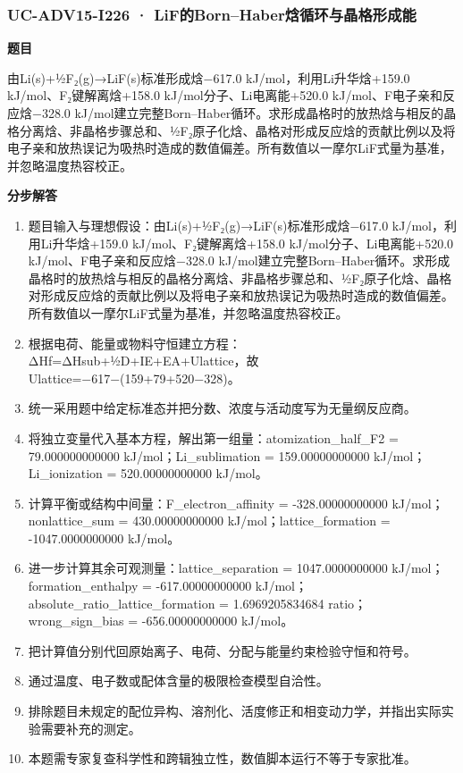 \documentclass[UTF8,11pt,a4paper]{ctexart}
\begin{document}
\subsubsection*{UC-ADV15-I226 · LiF的Born–Haber焓循环与晶格形成能}
\noindent\textbf{题目}\par
由Li(s)+½F₂(g)→LiF(s)标准形成焓−617.0 kJ/mol，利用Li升华焓+159.0 kJ/mol、F₂键解离焓+158.0 kJ/mol分子、Li电离能+520.0 kJ/mol、F电子亲和反应焓−328.0 kJ/mol建立完整Born–Haber循环。求形成晶格时的放热焓与相反的晶格分离焓、非晶格步骤总和、½F₂原子化焓、晶格对形成反应焓的贡献比例以及将电子亲和放热误记为吸热时造成的数值偏差。所有数值以一摩尔LiF式量为基准，并忽略温度热容校正。\par
\medskip\noindent\textbf{分步解答}
\begin{enumerate}
\item 题目输入与理想假设：由Li(s)+½F₂(g)→LiF(s)标准形成焓−617.0 kJ/mol，利用Li升华焓+159.0 kJ/mol、F₂键解离焓+158.0 kJ/mol分子、Li电离能+520.0 kJ/mol、F电子亲和反应焓−328.0 kJ/mol建立完整Born–Haber循环。求形成晶格时的放热焓与相反的晶格分离焓、非晶格步骤总和、½F₂原子化焓、晶格对形成反应焓的贡献比例以及将电子亲和放热误记为吸热时造成的数值偏差。所有数值以一摩尔LiF式量为基准，并忽略温度热容校正。
\item 根据电荷、能量或物料守恒建立方程：ΔHf=ΔHsub+½D+IE+EA+Ulattice，故Ulattice=−617−(159+79+520−328)。
\item 统一采用题中给定标准态并把分数、浓度与活动度写为无量纲反应商。
\item 将独立变量代入基本方程，解出第一组量：atomization\_half\_F2 = 79.000000000000 kJ/mol；Li\_sublimation = 159.00000000000 kJ/mol；Li\_ionization = 520.00000000000 kJ/mol。
\item 计算平衡或结构中间量：F\_electron\_affinity = -328.00000000000 kJ/mol；nonlattice\_sum = 430.00000000000 kJ/mol；lattice\_formation = -1047.0000000000 kJ/mol。
\item 进一步计算其余可观测量：lattice\_separation = 1047.0000000000 kJ/mol；formation\_enthalpy = -617.00000000000 kJ/mol；absolute\_ratio\_lattice\_formation = 1.6969205834684 ratio；wrong\_sign\_bias = -656.00000000000 kJ/mol。
\item 把计算值分别代回原始离子、电荷、分配与能量约束检验守恒和符号。
\item 通过温度、电子数或配体含量的极限检查模型自洽性。
\item 排除题目未规定的配位异构、溶剂化、活度修正和相变动力学，并指出实际实验需要补充的测定。
\item 本题需专家复查科学性和跨辑独立性，数值脚本运行不等于专家批准。
\end{enumerate}
\end{document}
